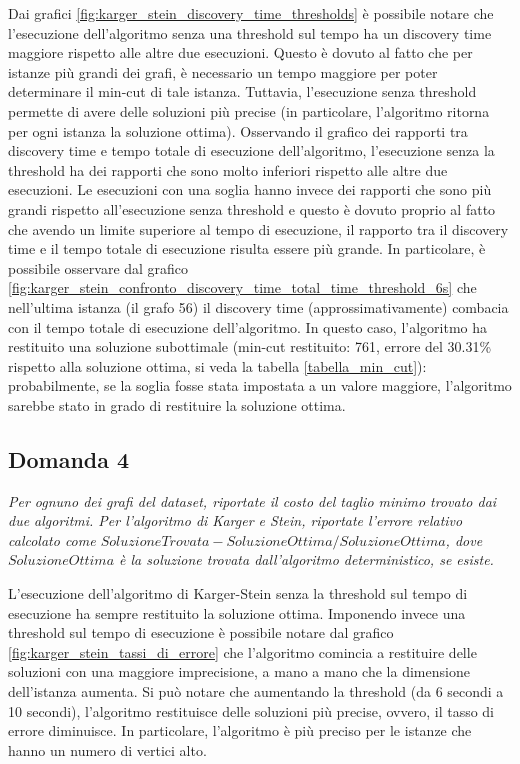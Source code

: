 Dai grafici \ref{fig:karger_stein_discovery_time_thresholds} è possibile notare che 
l'esecuzione dell'algoritmo senza una threshold sul tempo ha un discovery 
time maggiore rispetto alle altre due esecuzioni. Questo è dovuto al fatto che per 
istanze più grandi dei grafi, è necessario un tempo maggiore per poter determinare 
il min-cut di tale istanza. Tuttavia, l'esecuzione senza threshold permette di avere 
delle soluzioni più precise (in particolare, l'algoritmo ritorna per ogni istanza la 
soluzione ottima). Osservando il grafico dei rapporti tra discovery time e tempo totale 
di esecuzione dell'algoritmo, l'esecuzione senza la threshold ha dei rapporti che sono 
molto inferiori rispetto alle altre due esecuzioni. Le esecuzioni con una soglia 
hanno invece dei rapporti che sono più grandi rispetto all'esecuzione senza threshold 
e questo è dovuto proprio al fatto che avendo un limite superiore al tempo di 
esecuzione, il rapporto tra il discovery time e il tempo totale di esecuzione risulta  
essere più grande. In particolare, è possibile osservare dal grafico 
\ref{fig:karger_stein_confronto_discovery_time_total_time_threshold_6s} che 
nell'ultima istanza (il grafo 56) il discovery time (approssimativamente) combacia 
con il tempo totale di esecuzione dell'algoritmo. In questo caso, l'algoritmo ha 
restituito una soluzione subottimale (min-cut restituito: 761, errore del 30.31\% 
rispetto alla soluzione ottima, si veda la tabella \ref{tabella_min_cut}): 
probabilmente, se la soglia fosse stata impostata a un valore maggiore, l'algoritmo 
sarebbe stato in grado di restituire la soluzione ottima.

\subsection{Domanda 4}
\textit{Per ognuno dei grafi del dataset, riportate il costo del taglio minimo trovato dai due algoritmi. Per l'algoritmo di Karger e Stein, riportate l'errore relativo calcolato come $SoluzioneTrovata-SoluzioneOttima/SoluzioneOttima$, dove $SoluzioneOttima$ è la soluzione trovata dall'algoritmo deterministico, se esiste.}

L'esecuzione dell'algoritmo di Karger-Stein senza la threshold sul 
tempo di esecuzione ha sempre restituito la soluzione ottima. 
Imponendo invece una threshold sul tempo di esecuzione è possibile 
notare dal grafico \ref{fig:karger_stein_tassi_di_errore} che 
l'algoritmo comincia a restituire delle soluzioni con una maggiore 
imprecisione, a mano a mano che la dimensione dell'istanza aumenta. 
Si può notare che aumentando la threshold (da 6 secondi a 10 secondi), 
l'algoritmo restituisce delle soluzioni più precise, ovvero, il tasso di 
errore diminuisce. In particolare, l'algoritmo è più preciso per le 
istanze che hanno un numero di vertici alto.

